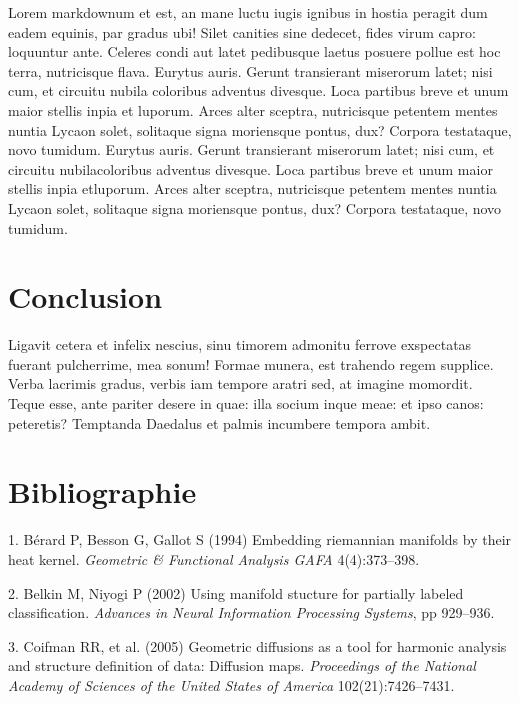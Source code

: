 \documentclass[9pt,twocolumn,twoside,]{pnas-new}
\begin{document}
Lorem markdownum et est, an mane luctu iugis ignibus in hostia peragit
dum eadem equinis, par gradus ubi! Silet canities sine dedecet, fides
virum capro: loquuntur ante. Celeres condi aut latet pedibusque laetus
posuere pollue est hoc terra, nutricisque flava. Eurytus auris. Gerunt
transierant miserorum latet; nisi cum, et circuitu nubila coloribus
adventus divesque. Loca partibus breve et unum maior stellis inpia et
luporum. Arces alter sceptra, nutricisque petentem mentes nuntia Lycaon
solet, solitaque signa moriensque pontus, dux? Corpora testataque, novo
tumidum. Eurytus auris. Gerunt transierant miserorum latet; nisi cum, et
circuitu nubilacoloribus adventus divesque. Loca partibus breve et unum
maior stellis inpia etluporum. Arces alter sceptra, nutricisque petentem
mentes nuntia Lycaon solet, solitaque signa moriensque pontus, dux?
Corpora testataque, novo tumidum.

\hypertarget{conclusion}{%
\section{Conclusion}\label{conclusion}}

Ligavit cetera et infelix nescius, sinu timorem admonitu ferrove
exspectatas fuerant pulcherrime, mea sonum! Formae munera, est trahendo
regem supplice. Verba lacrimis gradus, verbis iam tempore aratri sed, at
imagine momordit. Teque esse, ante pariter desere in quae: illa socium
inque meae: et ipso canos: peteretis? Temptanda Daedalus et palmis
incumbere tempora ambit.

\newpage

\hypertarget{bibliographie}{%
\section*{Bibliographie}\label{bibliographie}}

\hypertarget{refs}{}
\leavevmode\hypertarget{ref-berard1994embedding}{}%
1. Bérard P, Besson G, Gallot S (1994) Embedding riemannian manifolds by
their heat kernel. \emph{Geometric \& Functional Analysis GAFA}
4(4):373--398.

\leavevmode\hypertarget{ref-belkin2002using}{}%
2. Belkin M, Niyogi P (2002) Using manifold stucture for partially
labeled classification. \emph{Advances in Neural Information Processing
Systems}, pp 929--936.

\leavevmode\hypertarget{ref-coifman2005geometric}{}%
3. Coifman RR, et al. (2005) Geometric diffusions as a tool for harmonic
analysis and structure definition of data: Diffusion maps.
\emph{Proceedings of the National Academy of Sciences of the United
States of America} 102(21):7426--7431.



% 
\end{document}

